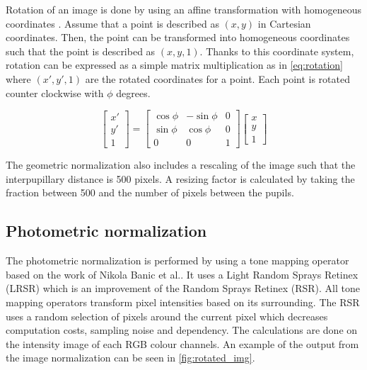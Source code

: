 Rotation of an image is done by using an affine transformation with homogeneous coordinates \cite{li2001generalized}. Assume that a point is described as $(x, y)$ in Cartesian coordinates. Then, the point can be transformed into homogeneous coordinates such that the point is described as $(x, y, 1)$. Thanks to this coordinate system, rotation can be expressed as a simple matrix multiplication as in \cref{eq:rotation} where $(x', y', 1)$ are the rotated coordinates for a point. Each point is rotated counter clockwise with $\phi$ degrees.

\begin{equation} \label{eq:rotation}
\begin{bmatrix}
x' \\[0.3em]
y' \\[0.3em]
1
\end{bmatrix}
=
\begin{bmatrix}
	\cos{\phi} & -\sin{\phi} & 0 \\[0.3em]
	\sin{\phi} & \cos{\phi}  & 0 \\[0.3em]
	0          & 0           & 1
\end{bmatrix}
\begin{bmatrix}
x \\[0.3em]
y \\[0.3em]
1
\end{bmatrix}
\end{equation}

The geometric normalization also includes a rescaling of the image such that the interpupillary distance is 500 pixels. A resizing factor is calculated by taking the fraction between 500 and the number of pixels between the pupils.  

\subsection{Photometric normalization} \label{subsec:photo_norm} 

The photometric normalization is performed by using a tone mapping operator based on the work of Nikola Banic et al.\cite{badger}. It uses a Light Random Sprays Retinex (LRSR) which is an improvement of the Random Sprays Retinex (RSR)\cite{RSR}. All tone mapping operators transform pixel intensities based on its surrounding. The RSR uses a random selection of pixels around the current pixel which decreases computation costs, sampling noise and dependency. The calculations are done on the intensity image of each RGB colour channels. An example of the output from the image normalization can be seen in \cref{fig:rotated_img}.

